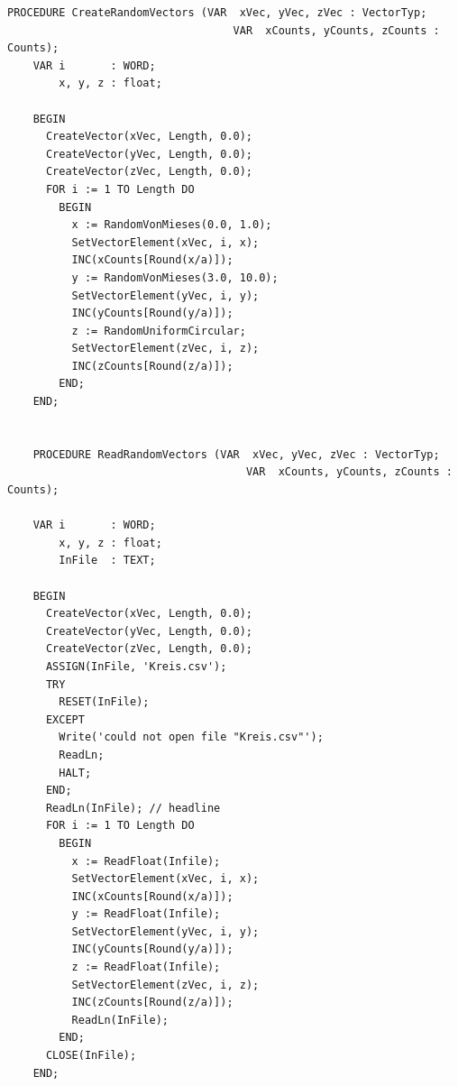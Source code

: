 \begin{refsection}
\begin{lstlisting}[caption=Test program]
    PROCEDURE CreateRandomVectors (VAR  xVec, yVec, zVec : VectorTyp;
                                   VAR  xCounts, yCounts, zCounts : Counts);
    VAR i       : WORD;
        x, y, z : float;

    BEGIN
      CreateVector(xVec, Length, 0.0);
      CreateVector(yVec, Length, 0.0);
      CreateVector(zVec, Length, 0.0);
      FOR i := 1 TO Length DO
        BEGIN
          x := RandomVonMieses(0.0, 1.0);
          SetVectorElement(xVec, i, x);
          INC(xCounts[Round(x/a)]);
          y := RandomVonMieses(3.0, 10.0);
          SetVectorElement(yVec, i, y);
          INC(yCounts[Round(y/a)]);
          z := RandomUniformCircular;
          SetVectorElement(zVec, i, z);
          INC(zCounts[Round(z/a)]);
        END;
    END;


    PROCEDURE ReadRandomVectors (VAR  xVec, yVec, zVec : VectorTyp;
                                     VAR  xCounts, yCounts, zCounts : Counts);

    VAR i       : WORD;
        x, y, z : float;
        InFile  : TEXT;

    BEGIN
      CreateVector(xVec, Length, 0.0);
      CreateVector(yVec, Length, 0.0);
      CreateVector(zVec, Length, 0.0);
      ASSIGN(InFile, 'Kreis.csv');
      TRY
        RESET(InFile);
      EXCEPT
        Write('could not open file "Kreis.csv"');
        ReadLn;
        HALT;
      END;
      ReadLn(InFile); // headline
      FOR i := 1 TO Length DO
        BEGIN
          x := ReadFloat(Infile);
          SetVectorElement(xVec, i, x);
          INC(xCounts[Round(x/a)]);
          y := ReadFloat(Infile);
          SetVectorElement(yVec, i, y);
          INC(yCounts[Round(y/a)]);
          z := ReadFloat(Infile);
          SetVectorElement(zVec, i, z);
          INC(zCounts[Round(z/a)]);
          ReadLn(InFile);
        END;
      CLOSE(InFile);
    END;


\end{lstlisting}
\end{refsection}
